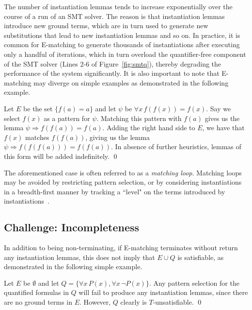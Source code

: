 \documentclass{easychair}
\begin{document}
The number of instantiation lemmas tends to increase exponentially over the course of a run of an SMT solver.
The reason is that instantiation lemmas introduce new ground terms, which are in turn used to generate new substitutions that lead to
new instantiation lemmas and so on.
In practice, it is common for E-matching to generate thousands of instantiations after executing only a handful of iterations,
which in turn overload the quantifier-free component of the SMT solver (Lines 2-6 of Figure~\ref{fig:smtq}),
thereby degrading the performance of the system significantly.
It is also important to note that E-matching may diverge on simple examples
as demonstrated in the following example.

\begin{example}
Let $E$ be the set $\{ f( a ) = a \}$ and let $\psi$ be $\forall x\, f( f( x ) ) = f( x )$.
Say we select $f( x )$ as a pattern for $\psi$.
Matching this pattern with $f( a )$ gives us the lemma $\psi \Rightarrow f( f( a ) ) = f( a )$.
Adding the right hand side to $E$, we have that $f( x )$ matches $f( f( a ) )$, giving us the lemma $\psi \Rightarrow f( f( f( a ) ) ) = f( f( a ) )$.
In absence of further heuristics, lemmas of this form will be added indefinitely.
\qed
\end{example}

The aforementioned case is often referred to as a \emph{matching loop}.
Matching loops may be avoided by
restricting pattern selection, or by
considering instantiations in a breadth-first manner by tracking a ``level" on the terms introduced by instantiations~\cite{GeBarrettTinelli07}.

\subsection{Challenge: Incompleteness}

In addition to being non-terminating, if E-matching terminates without return any instantiation lemmas,
this does not imply that $E \cup Q$ is satisfiable, as demonstrated in the following simple example.

\begin{example}
Let $E$ be $\emptyset$ and let $Q = \{ \forall x\, P( x ), \forall x\, \neg P( x ) \}$.
Any pattern selection for the quantified formulas in $Q$ will fail to produce any instantiation lemmas,
since there are no ground terms in $E$.
However, $Q$ clearly is $T$-unsatisfiable.
\qed
\end{example}
\end{document}
